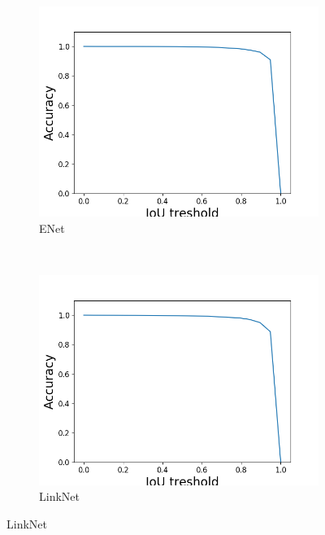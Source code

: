 \documentclass{kththesis}
\begin{document}
\begin{figure}[h]
    \centering
    \begin{subfigure}[b]{0.45\textwidth}
        \includegraphics[width=\textwidth]{ENet_test_AP}
        \caption{ENet}
        \label{fig:AP_ENet}
    \end{subfigure}
    ~ %
    \begin{subfigure}[b]{0.45\textwidth}
        \includegraphics[width=\textwidth]{LinkNet_test_AP}
        \caption{LinkNet}
        \label{fig:AP_LinkNet}
      \end{subfigure}
      

\end{figure}
\end{document}
